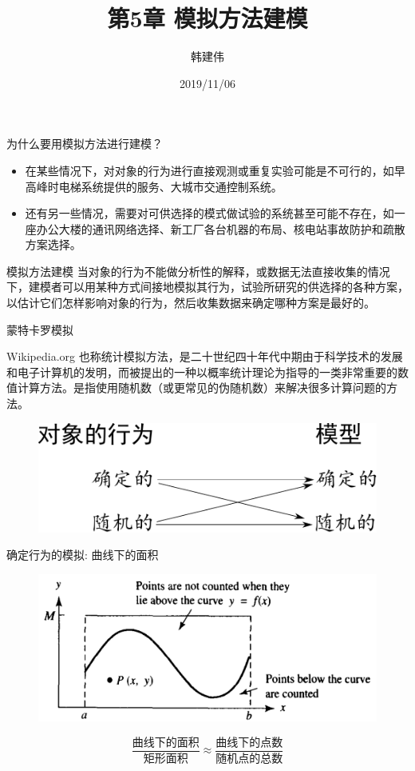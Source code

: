 \documentclass[UTF8]{ctexbeamer}
\title{第5章 模拟方法建模}
\author{韩建伟}
\institute{
  信息学院\\
  \texttt{hanjianwei@zjgsu.edu.cn}
}
\date{2019/11/06}
\begin{document}
\begin{frame}[plain]
  \titlepage{}
\end{frame}

\begin{frame}{为什么要用模拟方法进行建模？}

  \begin{itemize}
  \item 在某些情况下，对对象的行为进行直接观测或重复实验可能是不可行的，如早高峰时电梯系统提供的服务、大城市交通控制系统。
  \item 还有另一些情况，需要对可供选择的模式做试验的系统甚至可能不存在，如一座办公大楼的通讯网络选择、新工厂各台机器的布局、核电站事故防护和疏散方案选择。
  \end{itemize}

  \begin{block}{模拟方法建模}
    当对象的行为不能做分析性的解释，或数据无法直接收集的情况下，建模者可以用某种方式间接地模拟其行为，试验所研究的供选择的各种方案，以估计它们怎样影响对象的行为，然后收集数据来确定哪种方案是最好的。
  \end{block}
\end{frame}

\begin{frame}{蒙特卡罗模拟}
  \begin{block}{Wikipedia.org}
    也称统计模拟方法，是二十世纪四十年代中期由于科学技术的发展和电子计算机的发明，而被提出的一种以概率统计理论为指导的一类非常重要的数值计算方法。是指使用随机数（或更常见的伪随机数）来解决很多计算问题的方法。
  \end{block}

  \begin{figure}
    \centering
    \includegraphics[width=.7\textwidth{}]{action-model.pdf}
  \end{figure}
\end{frame}

\begin{frame}{确定行为的模拟: 曲线下的面积}
  \begin{figure}
    \centering
    \includegraphics[width=.7\textwidth{}]{curve.png}
  \end{figure}

  \[
  \frac{\text{曲线下的面积}}{\text{矩形面积}} \approx \frac{\text{曲线下的点数}}{\text{随机点的总数}}
  \]
  
\end{frame}
\end{document}
